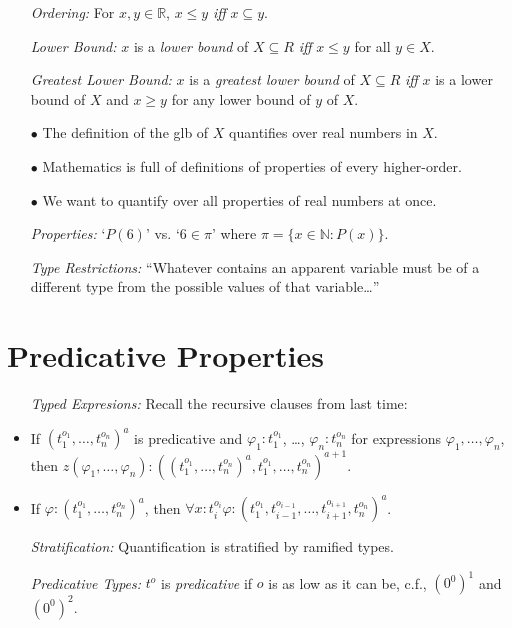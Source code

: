 \documentclass[a4paper, 11pt]{article} %
\newcommand{\set}[1]{\lbrace#1\rbrace} %
\newcommand{\N}{\mathbb{N}}
\newcommand{\R}{\mathbb{R}}
\begin{document}
\begin{enumerate}
  \item[\it Ordering:] For $x, y \in \R$, $x \leq y$ \textit{iff} $x \subseteq y$. 
  \item[\it Lower Bound:] $x$ is a \textit{lower bound} of $X \subseteq R$ \textit{iff} $x \leq y$ for all $y \in X$.  
  \item[\it Greatest Lower Bound:] $x$ is a \textit{greatest lower bound} of $X \subseteq R$ \textit{iff} $x$ is a lower bound of $X$ and $x \geq y$ for any lower bound of $y$ of $X$.
    \item[$\bullet$] The definition of the glb of $X$ quantifies over real numbers in $X$.
    \item[$\bullet$] Mathematics is full of definitions of properties of every higher-order.
    \item[$\bullet$] We want to quantify over all properties of real numbers at once.
  \item[\it Properties:] `$P(6)$' vs. `$6 \in \pi$' where $\pi=\set{x \in \N : P(x)}$.
  \item[\it Type Restrictions:] ``Whatever contains an apparent variable must be of a different type from the possible values of that variable\ldots'' 
\end{enumerate}




\section*{Predicative Properties}

  \begin{itemize}
    \item[\it Typed Expresions:] Recall the recursive clauses from last time:
      \item If $(t_1^{o_1},\ldots,t_n^{o_n})^a$ is predicative and $\varphi_1 : t_1^{o_1}$, \ldots, $\varphi_n : t_n^{o_n}$ for expressions $\varphi_1,\ldots,\varphi_n$, then $z(\varphi_1,\ldots,\varphi_n) : ((t_1^{o_1},\ldots,t_n^{o_n})^a,t_1^{o_1},\ldots,t_n^{o_n})^{a+1}$.
      \item If $\varphi : (t_1^{o_1},\ldots,t_n^{o_n})^a$, then $\forall x : t_i^{o_i} \varphi : (t_1^{o_1},t_{i-1}^{o_{i-1}},\ldots,t_{i+1}^{o_{i+1}},t_n^{o_n})^a$.
    \item[\it Stratification:] Quantification is stratified by ramified types.
    \item[\it Predicative Types:] $t^o$ is \textit{predicative} if $o$ is as low as it can be, c.f., $(0^0)^1$ and $(0^0)^2$.  
  \end{itemize}
\end{document}
